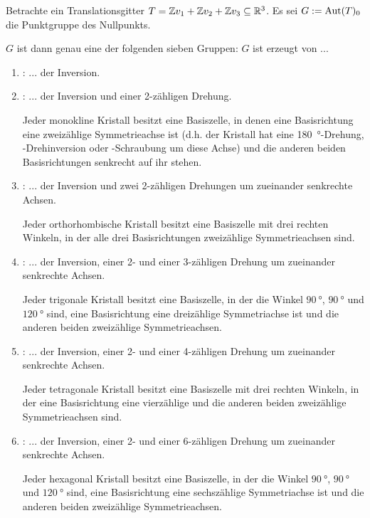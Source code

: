 \begin{theoremdef}
Betrachte ein Translationsgitter $T=\mathbb{Z} v_1+\mathbb{Z} v_2+\mathbb{Z} v_3\subseteq\mathbb{R}^3$. Es sei $G:=\operatorname{Aut}(T)_0$ die Punktgruppe des Nullpunkts.

$G$ ist dann genau eine der folgenden sieben Gruppen: $G$ ist erzeugt von ...
\begin{enumerate}
\item {}: ... der Inversion.

\item {}: ... der Inversion und einer 2-zähligen Drehung.

Jeder monokline Kristall besitzt eine Basiszelle, in denen eine Basisrichtung eine zweizählige Symmetrieachse ist (d.h. der Kristall hat eine \SI{180}{\degree}-Drehung, -Drehinversion oder -Schraubung um diese Achse) und die anderen beiden Basisrichtungen senkrecht auf ihr stehen.

\item {}: ... der Inversion und zwei 2-zähligen Drehungen um zueinander senkrechte Achsen.

Jeder orthorhombische Kristall besitzt eine Basiszelle mit drei rechten Winkeln, in der alle drei Basisrichtungen zweizählige Symmetrieachsen sind.

\item {}: ... der Inversion, einer 2- und einer 3-zähligen Drehung um zueinander senkrechte Achsen.

Jeder trigonale Kristall besitzt eine Basiszelle, in der die Winkel $\SI{90}{\degree}$, $\SI{90}{\degree}$ und $\SI{120}{\degree}$ sind, eine Basisrichtung eine dreizählige Symmetriachse ist und die anderen beiden zweizählige Symmetrieachsen.

\item {}: ... der Inversion, einer 2- und einer 4-zähligen Drehung um zueinander senkrechte Achsen.

Jeder tetragonale Kristall besitzt eine Basiszelle mit drei rechten Winkeln, in der eine Basisrichtung eine vierzählige und die anderen beiden zweizählige Symmetrieachsen sind.

\item {}: ... der Inversion, einer 2- und einer 6-zähligen Drehung um zueinander senkrechte Achsen.

Jeder hexagonal Kristall besitzt eine Basiszelle, in der die Winkel $\SI{90}{\degree}$, $\SI{90}{\degree}$ und $\SI{120}{\degree}$ sind, eine Basisrichtung eine sechszählige Symmetriachse ist und die anderen beiden zweizählige Symmetrieachsen.


\end{enumerate}
\end{theoremdef}
